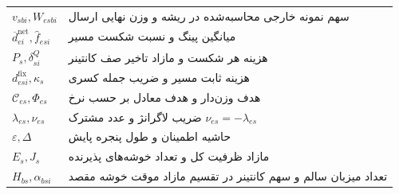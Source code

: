 \begin{longtable}{>{\centering\arraybackslash}p{3.4cm}p{9.5cm}}
$v_{sbi},W_{esbi}$ & سهم نمونه خارجی محاسبه‌شده در ریشه و وزن نهایی ارسال \\
$\overline d^{\mathrm{net}}_{ei},\widehat f_{esi}$ & میانگین پینگ و نسبت شکست مسیر \\
$P_s,\delta^Q_{si}$ & هزینه هر شکست و مازاد تاخیر صف کانتینر \\
$d^{\mathrm{fix}}_{esi},\kappa_s$ & هزینه ثابت مسیر و ضریب جمله کسری \\
$\mathcal C_{es},\Phi_{es}$ & هدف وزن‌دار و هدف معادل بر حسب نرخ \\
$\lambda_{es},\nu_{es}$ & ضریب لاگرانژ و عدد مشترک $\nu_{es}=-\lambda_{es}$ \\
$\varepsilon,\Delta$ & حاشیه اطمینان و طول پنجره پایش \\
$E_s,J_s$ & مازاد ظرفیت کل و تعداد خوشه‌های پذیرنده \\
$H_{bs},\alpha_{bsi}$ & تعداد میزبان سالم و سهم کانتینر در تقسیم مازاد موقت خوشه مقصد \\
\end{longtable}
\cleardoublepage
